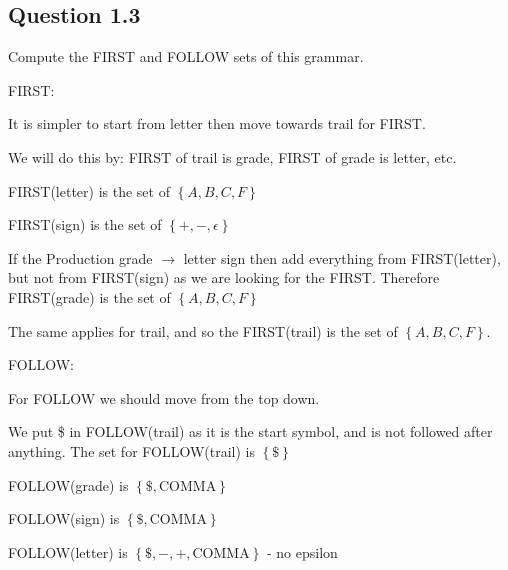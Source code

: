 \documentclass[11pt, oneside]{article}
\begin{document}
\subsection{Question 1.3}
\par Compute the FIRST and FOLLOW sets of this grammar.
\par \noindent FIRST:
\par It is simpler to start from letter then move towards trail for FIRST.
\par We will do this by: FIRST of trail is grade, FIRST of grade is letter, etc.
\par FIRST(letter) is the set of $\left\{ {A, B, C, F}\right\}$
\par FIRST(sign) is the set of $\left\{ {+, -, \epsilon}\right\}$
\par If the Production grade $ \rightarrow$  letter sign then add everything from FIRST(letter), but not from FIRST(sign) as we are looking for the FIRST. Therefore FIRST(grade) is the set of $\left\{ {A, B, C, F}\right\}$
\par The same applies for trail, and so the FIRST(trail) is the set of $\left\{ {A, B, C, F}\right\}$.
\par \noindent FOLLOW:
\par For FOLLOW we should move from the top down.
\par We put \$ in FOLLOW(trail) as it is the start symbol, and is not followed after anything. The set for FOLLOW(trail) is $\left\{ {\$}\right\}$
\par FOLLOW(grade) is $\left\{ {\$, \textrm{COMMA}}\right\}$
\par FOLLOW(sign) is $\left\{ {\$, \textrm{COMMA}}\right\}$
\par FOLLOW(letter) is $\left\{ {\$, -, +, \textrm{COMMA}}\right\}$ - no epsilon
\end{document}
